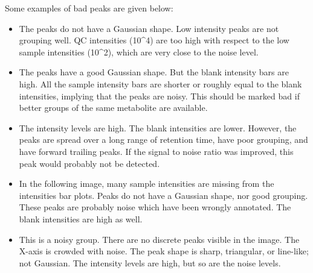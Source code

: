 \documentclass[letterpaper,10pt,english,openany,oneside]{sphinxmanual}
\begin{document}
Some examples of bad peaks are given below:
\begin{itemize}
\item {} 
The peaks do not have a Gaussian shape. Low intensity peaks are not grouping well. QC intensities (10\textasciicircum{}4) are too high with respect to the low sample intensities (10\textasciicircum{}2), which are very close to the noise level.

\end{itemize}

\begin{itemize}
\item {} 
The peaks have a good Gaussian shape. But the blank intensity bars are high. All the sample intensity bars are shorter or roughly equal to the blank intensities, implying that the peaks are noisy. This should be marked bad if better groups of the same metabolite are available.

\end{itemize}

\begin{itemize}
\item {} 
The intensity levels are high. The blank intensities are lower. However, the peaks are spread over a long range of retention time, have poor grouping, and have forward trailing peaks. If the signal to noise ratio was improved, this peak would probably not be detected.

\end{itemize}

\begin{itemize}
\item {} 
In the following image, many sample intensities are missing from the intensities bar plots. Peaks do not have a Gaussian shape, nor good grouping. These peaks are probably noise which have been wrongly annotated. The blank intensities are high as well.

\end{itemize}

\begin{itemize}
\item {} 
This is a noisy group. There are no discrete peaks visible in the image. The X-axis is crowded with noise. The peak shape is sharp, triangular, or line-like; not Gaussian. The intensity levels are high, but so are the noise levels.

\end{itemize}
\end{document}
